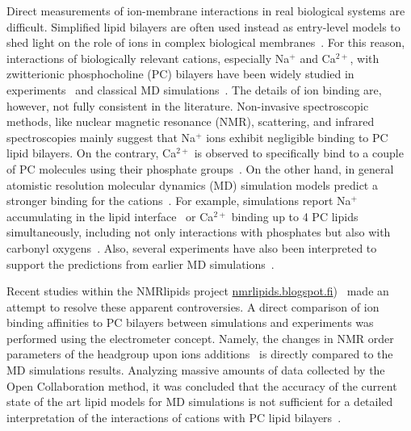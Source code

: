 \documentclass[aip,jcp,twocolumn]{revtex4}
\begin{document}
Direct measurements of ion-membrane interactions in real biological systems are difficult. Simplified lipid bilayers are often used instead as entry-level models to shed light on the role of ions in complex biological membranes~\cite{scherer87,seelig90,cevc90}. For this reason, interactions of biologically relevant cations, especially Na$^+$ and Ca$^{2+}$, with zwitterionic phosphocholine (PC) bilayers have been widely studied in experiments~\cite{akutsu81, altenbach84, seelig90, cevc90, tocanne90, binder02, pabst07, uhrikova08} and classical MD simulations~\cite{bockmann03, bockmann04, Berkowitz12, melcrova16, javanainen17}. The details of ion binding are, however, not fully consistent in the literature. Non-invasive spectroscopic methods, like nuclear magnetic resonance (NMR), scattering, and infrared spectroscopies mainly suggest that Na$^+$ ions exhibit negligible binding to PC lipid bilayers. On the contrary, Ca$^{2+}$ is observed to specifically bind to a couple of PC molecules using their phosphate groups~\cite{hauser76, hauser78, herbette84, akutsu81, altenbach84, binder02, pabst07, uhrikova08}. On the other hand, {\color{red} in general}  atomistic resolution molecular dynamics (MD) simulation models predict a stronger binding for the cations~\cite{catte16}. For example, simulations report Na$^+$ accumulating in the lipid interface~\cite{bockmann03} or Ca$^{2+}$ binding up to 4 PC lipids simultaneously, including not only interactions with phosphates but also with carbonyl oxygens~\cite{bockmann04, melcrova16, javanainen17}. {\color{red} Also, several experiments have also been interpreted to support the predictions from earlier MD simulations~\cite{bockmann03, vacha09a}. }

Recent studies within the NMRlipids project \url{nmrlipids.blogspot.fi})~\cite{catte16} made an attempt to resolve these apparent controversies. A direct comparison of ion binding affinities to PC bilayers between simulations and experiments was performed using the electrometer concept. Namely, the changes in NMR order parameters of the headgroup upon ions additions~\cite{seelig87} is directly compared to the MD simulations results. Analyzing massive amounts of data collected by the Open Collaboration method, it was concluded that the accuracy of the current state of the art lipid models for MD simulations is not sufficient for a detailed interpretation of the interactions of cations with PC lipid bilayers~\cite{catte16}.
\end{document}

